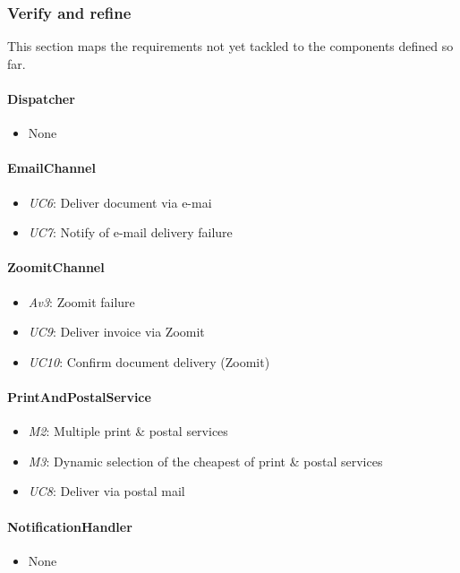 \documentclass[a4paper,10pt]{article}
\begin{document}
\subsubsection{Verify and refine}
This section maps the requirements not yet tackled to the components defined so far.
\paragraph{Dispatcher}
\begin{itemize}
	\item None
\end{itemize}

\paragraph{EmailChannel}
\begin{itemize}
	\item \emph{UC6}: Deliver document via e-mai
	\item \emph{UC7}: Notify of e-mail delivery failure
\end{itemize}

\paragraph{ZoomitChannel}
\begin{itemize}
	\item \emph{Av3}: Zoomit failure
	\item \emph{UC9}: Deliver invoice via Zoomit
	\item \emph{UC10}: Confirm document delivery (Zoomit)
\end{itemize}

\paragraph{PrintAndPostalService}
\begin{itemize}
	\item \emph{M2}: Multiple print \& postal services
	\item \emph{M3}: Dynamic selection of the cheapest of print \& postal services
	\item \emph{UC8}: Deliver via postal mail
\end{itemize}

\paragraph{NotificationHandler}
\begin{itemize}
	\item None
\end{itemize}
\end{document}
